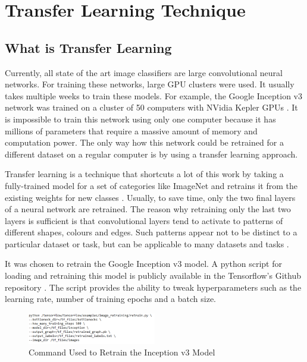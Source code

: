 \section{Transfer Learning Technique}

\subsection{What is Transfer Learning}

Currently, all state of the art image classifiers are large convolutional neural networks.  For training these networks, large GPU clusters were used.  It usually takes multiple weeks to train these models. For example,  the Google Inception v3 network was trained on a cluster of  50 computers with  NVidia Kepler GPUs \citep{incept}. It is impossible to train this network using only one computer because it has millions of parameters that require a massive amount of memory and computation power. The only way how this network could be retrained for a different dataset on a regular computer is by using a transfer learning approach. 

Transfer learning is a technique that shortcuts a lot of this work by taking a fully-trained model for a set of categories like ImageNet and retrains it from the existing weights for new classes \citep{tensorflow}. Usually,  to save time, only the two final layers of a neural network are retrained. The reason why retraining only the last two layers is sufficient is that convolutional layers tend to activate to patterns of different shapes, colours and edges. Such patterns appear not to be distinct to a particular dataset or task, but can be applicable to many datasets and tasks \citep{transfer}.

It was chosen to retrain the Google Inception v3 model. A python script for loading and retraining this model is publicly available in the Tensorflow's Github repository \citep{gitretrain}. The script provides the ability to tweak hyperparameters such as the learning rate, number of training epochs and a batch size. 


\begin{figure}[h]
\centering
\includegraphics[width=0.5\textwidth]{Figures/4/term.PNG}
\caption{Command Used to Retrain the Inception v3 Model}
\label{fig:retrain}
\end{figure}


